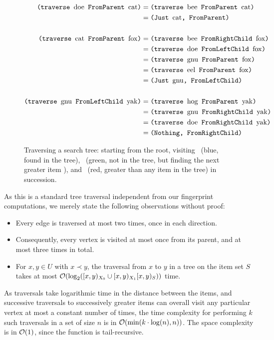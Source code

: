 \begin{figure*}
\begin{align*}
\traverse{\exampled}{FromParent}{\examplec} &= \traverse{\exampleb}{FromParent}{\examplec}\\
&= \mypair{Just \examplec}{FromParent}\\
\\
\traverse{\examplec}{FromParent}{\examplef} &= \traverse{\exampleb}{FromRightChild}{\examplef}\\
&= \traverse{\exampled}{FromLeftChild}{\examplef}\\
&= \traverse{\exampleg}{FromParent}{\examplef}\\
&= \traverse{\examplee}{FromParent}{\examplef}\\
&= \mypair{Just \exampleg}{FromLeftChild}\\
\\
\traverse{\exampleg}{FromLeftChild}{\exampley}&= \traverse{\exampleh}{FromParent}{\exampley}\\
&= \traverse{\exampleg}{FromRightChild}{\exampley}\\
&= \traverse{\exampled}{FromRightChild}{\exampley}\\
&= \mypair{Nothing}{FromRightChild}\\
\end{align*}
\caption{
Traversing a search tree: starting from the root, visiting \examplec\ (blue, found in the tree), \examplef\ (green, not in the tree, but finding the next greater item \exampleg), and \exampley\ (red, greater than any item in the tree) in succession.
}

\label{fig:traverse}
\end{figure*}

As this is a standard tree traversal independent from our fingerprint computations, we merely state the following observations without proof:

\begin{itemize}
\item Every edge is traversed at most two times, once in each direction.
\item Consequently, every vertex is visited at most once from its parent, and at most three times in total.
\item For $x, y \in U$ with $x \prec y$, the traversal from $x$ to $y$ in a tree on the item set $S$ takes at most $\mathcal{O}(\log_2([{x},{y})_{X_0} \cup [{x},{y})_{X_1}{[{x},{y})_{S}}))$ time.
\end{itemize}

As traversals take logarithmic time in the distance between the items, and successive traversals to successively greater items can overall visit any particular vertex at most a constant number of times, the time complexity for performing $k$ such traversals in a set of size $n$ is in $\mathcal{O}(\min(k \cdot \log(n), n))$. The space complexity is in $\mathcal{O}(1)$, since the function is tail-recursive.

